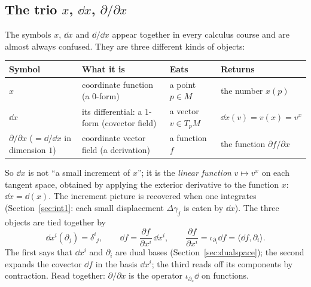 \subsection{The trio $x$, $\dd x$, $\partial/\partial x$}\label{sec:trio}

The symbols $x$, $\dd x$ and $\dd/\dd x$ appear together in every calculus course and are almost always confused. They are three
different kinds of objects:

\begin{center}
\small
\renewcommand{\arraystretch}{1.35}
\begin{tabular}{@{}p{2.3cm}p{5.0cm}p{3.1cm}p{3.4cm}@{}}
\toprule
\textbf{Symbol} & \textbf{What it is} & \textbf{Eats} & \textbf{Returns}\\
\midrule
$x$ & coordinate function (a $0$-form) & a point $p\in M$ & the number $x(p)$\\
$\dd x$ & its differential: a $1$-form (covector field) & a vector $v\in T_pM$ & $\dd x(v)=v(x)=v^x$\\
$\partial/\partial x$ ($=\dd/\dd x$ in dimension $1$) & coordinate vector field (a derivation) & a function $f$ & the function $\partial f/\partial x$\\
\bottomrule
\end{tabular}
\end{center}

So $\dd x$ is not ``a small increment of $x$''; it is the \emph{linear function} $v\mapsto v^x$ on each tangent space, obtained by applying the
exterior derivative to the function $x$: $\dd x=\dd(x)$. The increment picture is recovered when one integrates
(Section~\ref{sec:int1}: each small displacement $\Delta\gamma_j$ is eaten by $\dd x$). The three objects are tied together by
\begin{equation}\label{eq:trio}
\dd x^i(\partial_j)=\delta^i{}_j,\qquad \dd f=\frac{\partial f}{\partial x^i}\,\dd x^i,\qquad \frac{\partial f}{\partial x^i}=\iota_{\partial_i}\dd f=\langle\dd f,\partial_i\rangle .
\end{equation}
The first says that $\dd x^i$ and $\partial_i$ are dual bases (Section~\ref{sec:dualspace}); the second expands the covector $\dd f$ in the basis $\dd x^i$; the third reads off its components by contraction.
Read together: $\partial/\partial x$ is the operator $\iota_{\partial_x}\dd$ on functions.

